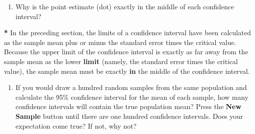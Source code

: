 \documentclass[a4paper]{book}
\newenvironment{Shaded}{\begin{snugshade}}{\end{snugshade}}
\newcommand{\KeywordTok}[1]{\textcolor[rgb]{0,0,0}{\textbf{#1}}}
\newcommand{\DecValTok}[1]{\textcolor[rgb]{0.00,0.00,0.00}{#1}}
\newcommand{\StringTok}[1]{\textcolor[rgb]{0.00,0.00,0.00}{#1}}
\newcommand{\ControlFlowTok}[1]{\textcolor[rgb]{0.00,0.00,0.00}{\textbf{#1}}}
\newcommand{\OperatorTok}[1]{\textcolor[rgb]{0.00,0.00,0.00}{\textbf{#1}}}
\newcommand{\NormalTok}[1]{#1}
\providecommand{\tightlist}{%
  \setlength{\itemsep}{0pt}\setlength{\parskip}{0pt}}
\theoremstyle{definition}
\theoremstyle{definition}
\theoremstyle{definition}
\theoremstyle{remark}
\begin{document}
\begin{enumerate}
\def\labelenumi{\arabic{enumi}.}
\setcounter{enumi}{1}
\tightlist
\item
  Why is the point estimate (dot) exactly in the middle of each
  confidence interval?
\end{enumerate}

\begin{Shaded}
\begin{Highlighting}[]
\OperatorTok{*}\StringTok{ }\NormalTok{In the preceding section, the limits of a confidence interval have been}
\NormalTok{calculated as the sample mean plus or minus the standard error times the}
\NormalTok{critical value. Because the upper limit of the confidence interval is exactly}
\NormalTok{as far away from the sample mean as the lower }\KeywordTok{limit}\NormalTok{ (namely, the standard}
\NormalTok{error times the critical value), the sample mean must be exactly }\ControlFlowTok{in}\NormalTok{ the middle}
\NormalTok{of the confidence interval.}
\end{Highlighting}
\end{Shaded}

\begin{enumerate}
\def\labelenumi{\arabic{enumi}.}
\setcounter{enumi}{2}
\tightlist
\item
  If you would draw a hundred random samples from the same population
  and calculate the 95\% confidence interval for the mean of each
  sample, how many confidence intervals will contain the true population
  mean? Press the \textbf{New Sample} button until there are one hundred
  confidence intervals. Does your expectation come true? If not, why
  not?
\end{enumerate}

\begin{Shaded}
\end{Shaded}
\end{document}
